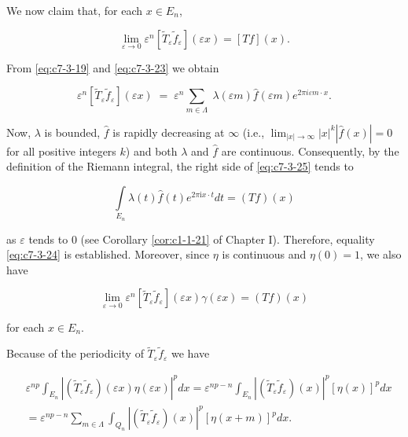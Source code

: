 We now claim that, for each $x \in E_n$,

\begin{equation}\label{eq:c7-3-24}
\lim_{\varepsilon\to0}\varepsilon^{n}[\widetilde{T}_{\varepsilon}\widetilde{f}_{\varepsilon}](\varepsilon x)=[T f](x).
\end{equation}

From \eqref{eq:c7-3-19} and \eqref{eq:c7-3-23} we obtain

\begin{equation}\label{eq:c7-3-25}
\varepsilon^{n}[\widetilde{T}_{\varepsilon}\widetilde{f}_{\varepsilon}](\varepsilon x)\;=\;\varepsilon^{n}\sum_{m\in\Lambda}\;\lambda(\varepsilon m)\widehat{f}(\varepsilon m)e^{2\pi i\varepsilon m\cdot x}.
\end{equation}

Now, $\lambda$ is bounded, $\hat{f}$ is rapidly decreasing at $\infty$ (i.e., $\lim_{|x|\to\infty}|x|^{k}|\hat{f}(x)|=0$ for all positive integers $k$) and both $\lambda$ and $\hat{f}$ are continuous. Consequently, by the definition of the Riemann integral, the right side of \eqref{eq:c7-3-25} tends to

\[
\int\limits_{E_{n}}\lambda(t)\hat{f}(t)e^{2\pi\mathrm{i}x\cdot t}dt=(Tf)(x)
\]

as $\varepsilon$ tends to 0 (see Corollary \ref{cor:c1-1-21} of Chapter I). Therefore, equality \eqref{eq:c7-3-24} is established. Moreover, since $\eta$ is continuous and $\eta(0) = 1$, we also have

\begin{equation}\label{eq:c7-3-26}
\lim_{\varepsilon\to0}\varepsilon^{n}[\widetilde{T}_{\varepsilon}\widetilde{f}_{\varepsilon}](\varepsilon x)\gamma(\varepsilon x)=(T f)(x)
\end{equation}

for each $x \in E_n$.

Because of the periodicity of $\tilde{T}_{\varepsilon}\tilde{f}_{\varepsilon}$ we have

\[
\begin{aligned}&{\varepsilon^{n p}\int_{E_{n}}|(\widetilde{T}_{\varepsilon}\widetilde{f}_{\varepsilon})(\varepsilon x)\eta(\varepsilon x)|^{p}d x}{{}=\varepsilon^{n p-n}\int_{E_{n}}|(\widetilde{T}_{\varepsilon}\widetilde{f}_{\varepsilon})(x)|^{p}[\eta(x)]^{p}d x}\\&{{}=\varepsilon^{n p-n}\sum_{m\in\Lambda}\int_{Q_{n}}|(\widetilde{T}_{\varepsilon}\widetilde{f}_{\varepsilon})(x)|^{p}[\eta(x+m)]^{p}d x.}\\ \end{aligned}
\]


